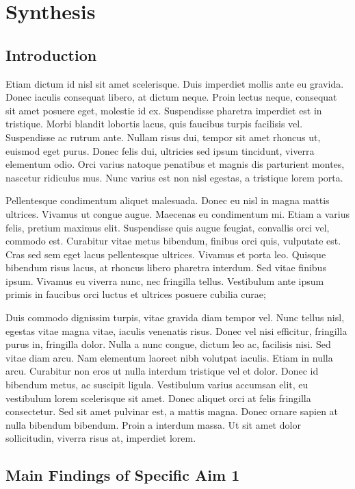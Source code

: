 \chapter{Synthesis}\label{chap:synthesis}

\section{Introduction}
Etiam dictum id nisl sit amet scelerisque. Duis imperdiet mollis ante eu gravida. Donec iaculis consequat libero, at dictum neque. Proin lectus neque, consequat sit amet posuere eget, molestie id ex. Suspendisse pharetra imperdiet est in tristique. Morbi blandit lobortis lacus, quis faucibus turpis facilisis vel. Suspendisse ac rutrum ante. Nullam risus dui, tempor sit amet rhoncus ut, euismod eget purus. Donec felis dui, ultricies sed ipsum tincidunt, viverra elementum odio. Orci varius natoque penatibus et magnis dis parturient montes, nascetur ridiculus mus. Nunc varius est non nisl egestas, a tristique lorem porta.

Pellentesque condimentum aliquet malesuada. Donec eu nisl in magna mattis ultrices. Vivamus ut congue augue. Maecenas eu condimentum mi. Etiam a varius felis, pretium maximus elit. Suspendisse quis augue feugiat, convallis orci vel, commodo est. Curabitur vitae metus bibendum, finibus orci quis, vulputate est. Cras sed sem eget lacus pellentesque ultrices. Vivamus et porta leo. Quisque bibendum risus lacus, at rhoncus libero pharetra interdum. Sed vitae finibus ipsum. Vivamus eu viverra nunc, nec fringilla tellus. Vestibulum ante ipsum primis in faucibus orci luctus et ultrices posuere cubilia curae;

Duis commodo dignissim turpis, vitae gravida diam tempor vel. Nunc tellus nisl, egestas vitae magna vitae, iaculis venenatis risus. Donec vel nisi efficitur, fringilla purus in, fringilla dolor. Nulla a nunc congue, dictum leo ac, facilisis nisi. Sed vitae diam arcu. Nam elementum laoreet nibh volutpat iaculis. Etiam in nulla arcu. Curabitur non eros ut nulla interdum tristique vel et dolor. Donec id bibendum metus, ac suscipit ligula. Vestibulum varius accumsan elit, eu vestibulum lorem scelerisque sit amet. Donec aliquet orci at felis fringilla consectetur. Sed sit amet pulvinar est, a mattis magna. Donec ornare sapien at nulla bibendum bibendum. Proin a interdum massa. Ut sit amet dolor sollicitudin, viverra risus at, imperdiet lorem.

\section{Main Findings of Specific Aim 1}

